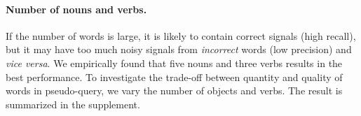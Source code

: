 

\vspace{-1em}\paragraph{Number of nouns and verbs.}
If the number of words is large, it is likely to contain correct signals (high recall), but it may have too much noisy signals from \emph{incorrect} words (low precision) and \emph{vice versa}.
We empirically found that five nouns and three verbs results in the best performance.
To investigate the trade-off between quantity and quality of words in pseudo-query, we vary the number of objects and verbs. The result is summarized in the supplement.


